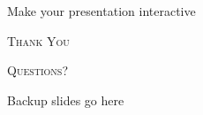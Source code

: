 \documentclass{cubeamer}
\begin{document}
\begin{frame}{Make your presentation interactive}
    \begin{cublock}
        \begin{overlayarea}{\textwidth}{\baselineskip}
        \end{overlayarea}
    \end{cublock}
\end{frame}

\begin{frame}[standout]
    \Huge\textsc{Thank You}
    
    \vfill
    
    \LARGE\textsc{Questions?}
\end{frame}

\appendix

\begin{frame}{Backup slides go here}
    
\end{frame}
\end{document}
